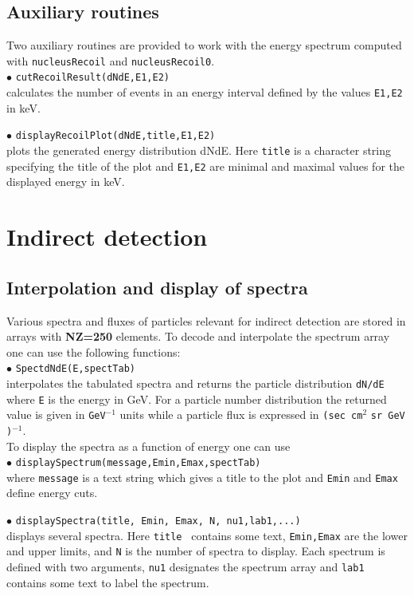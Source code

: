 \documentclass[12pt,a4paper]{article}
\begin{document}
\subsection{Auxiliary routines}
Two auxiliary routines are provided to work with the energy
spectrum computed with
\verb|nucleusRecoil| and  \verb|nucleusRecoil0|.\\
%
\noindent
$\bullet$ \verb|cutRecoilResult(dNdE,E1,E2)|\\
calculates the number of events in an energy interval defined by the
values \verb|E1,E2| in keV.

\noindent
$\bullet$ \verb|displayRecoilPlot(dNdE,title,E1,E2)|\\
plots the  generated energy distribution dNdE. Here \verb|title|
is a character string specifying the title of the plot and
\verb|E1,E2| are minimal and maximal values for the displayed
energy in keV.

\section{Indirect detection}




\subsection{Interpolation and display of spectra}
Various spectra and fluxes  of particles  relevant for indirect detection are stored in
arrays with {\bf NZ=250} elements. To decode and interpolate the spectrum array
one can use the following functions:\\
$\bullet$  \verb|SpectdNdE(E,spectTab)|\\
interpolates the tabulated spectra  and returns the 
particle distribution \verb|dN/dE|  where \verb|E| is the energy  in GeV. 
For a particle number  distribution the returned value is given in \verb|GeV|$^{-1}$
units while  a particle flux is expressed in \verb|(sec cm|$^2$ \verb|sr GeV )|$^{-1}$.\\
To display the  spectra  as a function of energy one can use \\
$\bullet$ \verb|displaySpectrum(message,Emin,Emax,spectTab)|\\
where  \verb|message| is a text string which gives a title to the  
plot and  \verb|Emin| and \verb|Emax| define  energy cuts.

\noindent
$\bullet$ \verb|displaySpectra(title, Emin, Emax, N, nu1,lab1,...)|\\
displays several spectra. Here {\tt title  } contains some text, {\tt Emin,Emax} are the lower and upper limits, and {\tt N} is the number of spectra to display.
Each spectrum is defined with  two arguments, \verb|nu1| designates the spectrum array and \verb|lab1| contains  some text to label the spectrum.
\end{document}
